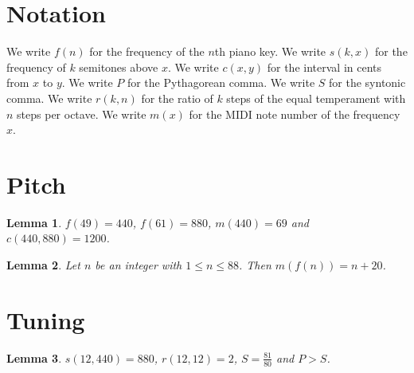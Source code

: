 \documentclass{article}
\newtheorem{lemma}{Lemma}
\begin{document}
\section{Notation}

We write $f(n)$ for the frequency of the $n$th piano key.
We write $s(k,x)$ for the frequency of $k$ semitones above $x$.
We write $c(x,y)$ for the interval in cents from $x$ to $y$.
We write $P$ for the Pythagorean comma.
We write $S$ for the syntonic comma.
We write $r(k,n)$ for the ratio of $k$ steps of the equal temperament with $n$ steps per octave.
We write $m(x)$ for the MIDI note number of the frequency $x$.

\section{Pitch}

\begin{lemma}\label{pitch}
$f(49)=440$, $f(61)=880$, $m(440)=69$ and $c(440,880)=1200$.
\end{lemma}

\begin{lemma}\label{midi}
Let $n$ be an integer with $1\le n\le88$. Then $m(f(n))=n+20$.
\end{lemma}

\section{Tuning}

\begin{lemma}\label{tuning}
$s(12,440)=880$, $r(12,12)=2$, $S=\frac{81}{80}$ and $P>S$.
\end{lemma}
\end{document}
